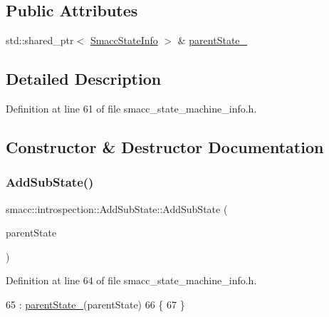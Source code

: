 \subsection*{Public Attributes}
\begin{DoxyCompactItemize}
\item 
std\+::shared\+\_\+ptr$<$ \hyperlink{classsmacc_1_1introspection_1_1SmaccStateInfo}{Smacc\+State\+Info} $>$ \& \hyperlink{structsmacc_1_1introspection_1_1AddSubState_a17bd7a0edd62758b94907ecc3644cd29}{parent\+State\+\_\+}
\end{DoxyCompactItemize}


\subsection{Detailed Description}


Definition at line 61 of file smacc\+\_\+state\+\_\+machine\+\_\+info.\+h.



\subsection{Constructor \& Destructor Documentation}
\mbox{\label{structsmacc_1_1introspection_1_1AddSubState_a9556919fdfce601d7746c8f3efcf298b}} 
\subsubsection{\texorpdfstring{Add\+Sub\+State()}{AddSubState()}}
{\footnotesize\ttfamily smacc\+::introspection\+::\+Add\+Sub\+State\+::\+Add\+Sub\+State (\begin{DoxyParamCaption}\item[{std\+::shared\+\_\+ptr$<$ \hyperlink{classsmacc_1_1introspection_1_1SmaccStateInfo}{Smacc\+State\+Info} $>$ \&}]{parent\+State }\end{DoxyParamCaption})\hspace{0.3cm}{\ttfamily [inline]}}



Definition at line 64 of file smacc\+\_\+state\+\_\+machine\+\_\+info.\+h.


\begin{DoxyCode}
65         : \hyperlink{structsmacc_1_1introspection_1_1AddSubState_a17bd7a0edd62758b94907ecc3644cd29}{parentState\_}(parentState)
66     \{
67     \}
\end{DoxyCode}


